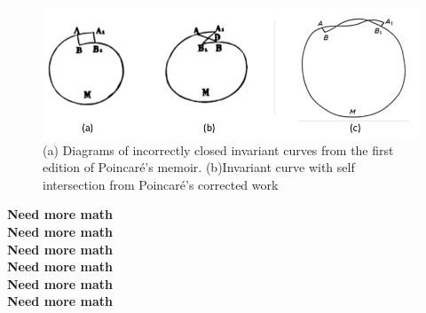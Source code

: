 \documentclass[11pt]{article} %
\begin{document}
\begin{figure}[H]
\centering
\includegraphics[width=5in]{curveIntersection1.png}\nonumber
\caption{(a) Diagrams of incorrectly closed invariant curves from the first edition of Poincaré's memoir. (b)Invariant curve with self intersection from Poincaré's corrected work \cite{BarrowGreen1997}}
\label{fig:curveIntersection1}
\end{figure}

\color{red}\textbf{Need more math}\color{black}\\
\color{red}\textbf{Need more math}\color{black}\\
\color{red}\textbf{Need more math}\color{black}\\
\color{red}\textbf{Need more math}\color{black}\\
\color{red}\textbf{Need more math}\color{black}\\
\color{red}\textbf{Need more math}\color{black}\\
\end{document}
